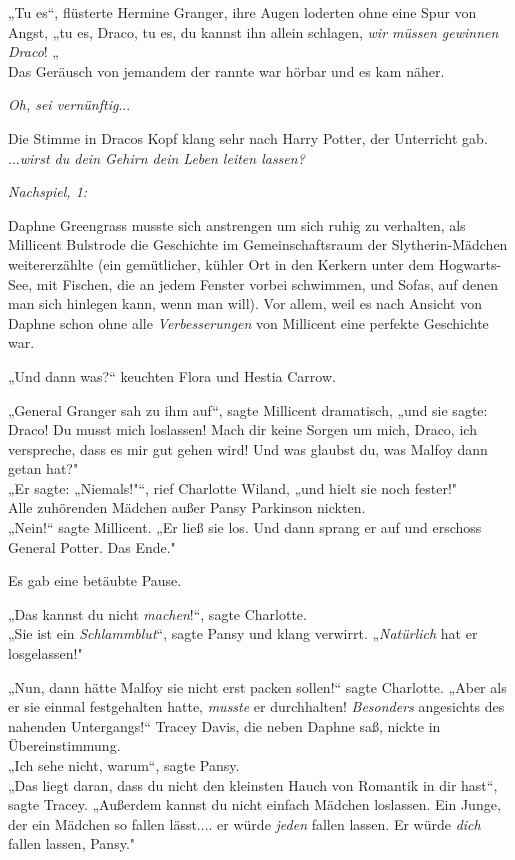{„Tu es“, flüsterte Hermine Granger, ihre Augen loderten ohne eine Spur von Angst, „tu es, Draco, tu es, du kannst ihn allein schlagen, \emph{wir müssen gewinnen Draco}! „\\ Das Geräusch von jemandem der rannte war hörbar und es kam näher.

\emph{Oh, sei vernünftig}...

Die Stimme in Dracos Kopf klang sehr nach Harry Potter, der Unterricht gab.\\ ...\emph{wirst du dein Gehirn dein Leben leiten lassen?}

\emph{\emph{Nachspiel, 1:}}

Daphne Greengrass musste sich anstrengen um sich ruhig zu verhalten, als Millicent Bulstrode die Geschichte im Gemeinschaftsraum der Slytherin-Mädchen weitererzählte (ein gemütlicher, kühler Ort in den Kerkern unter dem Hogwarts-See, mit Fischen, die an jedem Fenster vorbei schwimmen, und Sofas, auf denen man sich hinlegen kann, wenn man will). Vor allem, weil es nach Ansicht von Daphne schon ohne alle \emph{Verbesserungen} von Millicent eine perfekte Geschichte war.

„Und dann was?“ keuchten Flora und Hestia Carrow.

„General Granger sah zu ihm auf“, sagte Millicent dramatisch, „und sie sagte: Draco! Du musst mich loslassen! Mach dir keine Sorgen um mich, Draco, ich verspreche, dass es mir gut gehen wird! Und was glaubst du, was Malfoy dann getan hat?"\\ „Er sagte: „Niemals!"“, rief Charlotte Wiland, „und hielt sie noch fester!"\\ Alle zuhörenden Mädchen außer Pansy Parkinson nickten.\\ „Nein!“ sagte Millicent. „Er ließ sie los. Und dann sprang er auf und erschoss General Potter. Das Ende."

Es gab eine betäubte Pause.

„Das kannst du nicht \emph{machen}!“, sagte Charlotte.\\ „Sie ist ein \emph{Schlammblut}“, sagte Pansy und klang verwirrt. „\emph{Natürlich} hat er losgelassen!"

„Nun, dann hätte Malfoy sie nicht erst packen sollen!“ sagte Charlotte. „Aber als er sie einmal festgehalten hatte, \emph{musste} er durchhalten! \emph{Besonders} angesichts des nahenden Untergangs!“ Tracey Davis, die neben Daphne saß, nickte in Übereinstimmung.\\ „Ich sehe nicht, warum“, sagte Pansy.\\ „Das liegt daran, dass du nicht den kleinsten Hauch von Romantik in dir hast“, sagte Tracey. „Außerdem kannst du nicht einfach Mädchen loslassen. Ein Junge, der ein Mädchen so fallen lässt.... er würde \emph{jeden} fallen lassen. Er würde \emph{dich} fallen lassen, Pansy."

}
